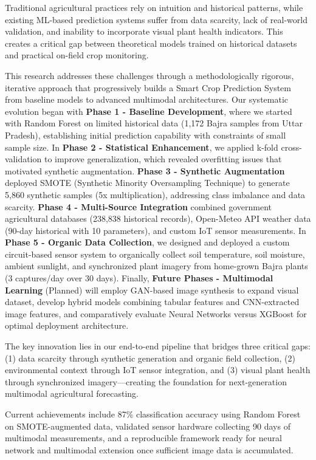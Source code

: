 \documentclass[10pt,twocolumn]{article}
\begin{document}
Traditional agricultural practices rely on intuition and historical patterns, while existing ML-based prediction systems suffer from data scarcity, lack of real-world validation, and inability to incorporate visual plant health indicators. This creates a critical gap between theoretical models trained on historical datasets and practical on-field crop monitoring.

This research addresses these challenges through a methodologically rigorous, iterative approach that progressively builds a Smart Crop Prediction System from baseline models to advanced multimodal architectures. Our systematic evolution began with \textbf{Phase 1 - Baseline Development}, where we started with Random Forest on limited historical data (1,172 Bajra samples from Uttar Pradesh), establishing initial prediction capability with constraints of small sample size. In \textbf{Phase 2 - Statistical Enhancement}, we applied k-fold cross-validation to improve generalization, which revealed overfitting issues that motivated synthetic augmentation. \textbf{Phase 3 - Synthetic Augmentation} deployed SMOTE (Synthetic Minority Oversampling Technique) to generate 5,860 synthetic samples (5x multiplication), addressing class imbalance and data scarcity. \textbf{Phase 4 - Multi-Source Integration} combined government agricultural databases (238,838 historical records), Open-Meteo API weather data (90-day historical with 10 parameters), and custom IoT sensor measurements. In \textbf{Phase 5 - Organic Data Collection}, we designed and deployed a custom circuit-based sensor system to organically collect soil temperature, soil moisture, ambient sunlight, and synchronized plant imagery from home-grown Bajra plants (3 captures/day over 30 days). Finally, \textbf{Future Phases - Multimodal Learning} (Planned) will employ GAN-based image synthesis to expand visual dataset, develop hybrid models combining tabular features and CNN-extracted image features, and comparatively evaluate Neural Networks versus XGBoost for optimal deployment architecture.

The key innovation lies in our end-to-end pipeline that bridges three critical gaps: (1) data scarcity through synthetic generation and organic field collection, (2) environmental context through IoT sensor integration, and (3) visual plant health through synchronized imagery—creating the foundation for next-generation multimodal agricultural forecasting.

Current achievements include 87\% classification accuracy using Random Forest on SMOTE-augmented data, validated sensor hardware collecting 90 days of multimodal measurements, and a reproducible framework ready for neural network and multimodal extension once sufficient image data is accumulated.
\end{document}
